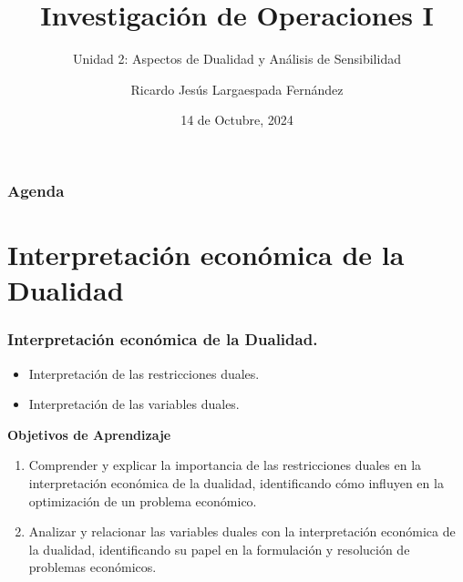 \documentclass{beamer}
\title{Investigación de Operaciones I}
\subtitle{Unidad 2: Aspectos de Dualidad y Análisis de Sensibilidad}
\author[Ricardo Largaespada]{Ricardo Jesús Largaespada Fernández}
\institute[UNI]{Ingeniería de Sistemas, DACTIC, UNI}
\date{14 de Octubre, 2024}
\begin{document}
\frame{\titlepage}

\begin{frame}
\frametitle{Agenda}
\tableofcontents
\end{frame}

\section{Interpretación económica de la Dualidad}
\begin{frame}
\frametitle{Interpretación económica de la Dualidad.}
\begin{itemize}
\item Interpretación de las restricciones duales.\\
\item Interpretación de las variables duales.
\end{itemize}
\pause
\textbf{Objetivos de Aprendizaje}
    \begin{enumerate}
        \item Comprender y explicar la importancia de las restricciones duales en la interpretación económica de la dualidad, identificando cómo influyen en la optimización de un problema económico.
        \item Analizar y relacionar las variables duales con la interpretación económica de la dualidad, identificando su papel en la formulación y resolución de problemas económicos.
    \end{enumerate}
\end{frame}
\end{document}
